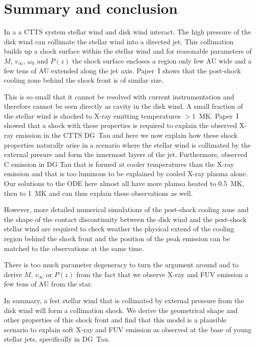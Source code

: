 \section{Summary and conclusion}
\label{sect:conclusion}
In a a CTTS system stellar wind and disk wind interact. The high pressure of the disk wind can collimate the stellar wind into a directed jet. This collimation builds up a shock surface within the stellar wind and for reasonable parameters of $\dot M$, $v_\infty$, $\omega_0$ and $P(z)$ the shock surface encloses a region only few AU wide and a few tens of AU extended along the jet axis. 
Paper~I shows that the post-shock cooling zone behind the shock front is of similar size.
 
This is so small that it cannot be resolved with current instrumentation and therefore cannot be seen directly as cavity in the disk wind. A small fraction of the stellar wind is shocked to X-ray emitting temperatures $>1$~MK. 
Paper~I showed that a shock with these properties is required to explain the observed X-ray emission in the CTTS DG~Tau and here we now explain how these shock properties naturally arise in a scenario where the stellar wind is collimated by the external presure and form the innermost layers of the jet.
Furthermore, \citet{2013A&A...550L...1S} observed C emission in DG Tau that is formed at cooler temperatures than the X-ray emission and that is too luminous to be explained by cooled X-ray plasma alone. Our solutions to the ODE here almost all have more plamsa heated to 0.5~MK, then to 1~MK and can thus explain these observations as well.

However, more detailed numerical simulations of the post-shock cooling zone and the shape of the contact discontinuity between the disk wind and the post-shock stellar wind are required to check weather the physical extend of the cooling region behind the shock front and the position of the peak emission can be matched to the observations at the same time.

There is too much parameter degeneracy to turn the argument around and to derive $\dot M$, $v_\infty$ or $P(z)$ from the fact that we observe X-ray and FUV emission a few tens of AU from the star.

In summary, a fest stellar wind that is collimated by external pressure from the disk wind will form a collimation shock. We derive the geometrical shape and other properties of this shock front and find that this model is a plausible scenario to explain soft X-ray and FUV emission as observed at the base of young stellar jets, specifically in DG~Tau.


